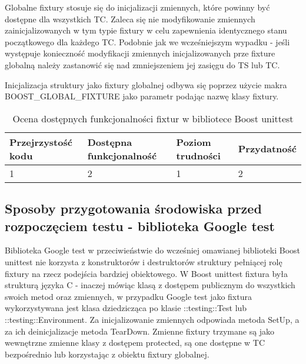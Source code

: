 \documentclass[12pt,a4paper,notitlepage]{report}
\begin{document}
Globalne fixtury stosuje się do inicjalizacji zmiennych, które powinny być dostępne dla wszystkich TC. Zaleca się nie modyfikowanie zmiennych zainicjalizowanych w tym typie fixtury w celu zapewnienia identycznego stanu początkowego dla każdego TC.
Podobnie jak we wcześniejszym wypadku - jeśli występuje konieczność modyfikacji zmiennych inicjalizowanych prze fixture globalną należy zastanowić się nad zmniejszeniem jej zasięgu do TS lub TC.

Inicjalizacja struktury jako fixtury globalnej odbywa się poprzez użycie makra BOOST{\_}GLOBAL{\_}FIXTURE jako parametr podając nazwę klasy fixtury.

			

\begin{center}
			\begin{table}[!ht]
			\caption{Ocena dostępnych funkcjonalności fixtur w bibliotece Boost unittest}
			\label{}
			\begin{tabular}[!hc]{|l|l|l|l|}
		\hline
		Przejrzystość kodu 	&	Dostępna funkcjonalność	&	Poziom trudności	&	Przydatność \\ \hline
		1					&	2						&	1					& 	2  			\\ \hline
			\end{tabular}
			\end{table} 
		\end{center}

\subsection{Sposoby przygotowania środowiska przed rozpoczęciem testu - biblioteka Google test}

Biblioteka Google test w przeciwieństwie do wcześniej omawianej biblioteki Boost unittest nie korzysta z konstruktorów i destruktorów struktury pełniącej rolę fixtury na rzecz podejścia bardziej obiektowego.
W Boost unittest fixtura była strukturą języka C - inaczej mówiąc klasą z dostępem publicznym do wszystkich swoich metod oraz zmiennych, w przypadku Google test jako fixtura wykorzystywana jest klasa dziedzicząca po klasie ::testing::Test lub ::testing::Environment.
Za inicjalizowanie zmiennych odpowiada metoda SetUp, a za ich deinicjalizacje metoda TearDown.
Zmienne fixtury trzymane są jako wewnętrzne zmienne klasy z dostępem protected, są one dostępne w TC bezpośrednio lub korzystając z obiektu fixtury globalnej.
\end{document}
